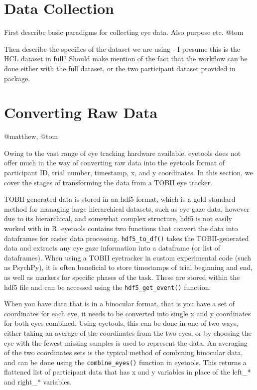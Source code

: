 \documentclass[
  man,
  floatsintext,
  longtable,
  nolmodern,
  notxfonts,
  notimes,
  colorlinks=true,linkcolor=blue,citecolor=blue,urlcolor=blue]{apa7}
\begin{document}
\section{Data Collection}\label{data-collection}

First describe basic paradigms for collecting eye data. Also purpose
etc. @tom

Then describe the specifics of the dataset we are using - I presume this
is the HCL dataset in full? Should make mention of the fact that the
workflow can be done either with the full dataset, or the two
participant dataset provided in package.

\section{Converting Raw Data}\label{converting-raw-data}

@matthew, @tom

Owing to the vast range of eye tracking hardware available, eyetools
does not offer much in the way of converting raw data into the eyetools
format of participant ID, trial number, timestamp, x, and y coordinates.
In this section, we cover the stages of transforming the data from a
TOBII eye tracker.

TOBII-generated data is stored in an hdf5 format, which is a
gold-standard method for managing large hierarchical datasets, such as
eye gaze data, however due to its hierarchical, and somewhat complex
structure, hdf5 is not easily worked with in R. eyetools contains two
functions that convert the data into dataframes for easier data
processing. \texttt{hdf5\_to\_df()} takes the TOBII-generated data and
extracts any eye gaze information into a dataframe (or list of
dataframes). When using a TOBII eyetracker in custom experimental code
(such as PsychPy), it is often beneficial to store timestamps of trial
beginning and end, as well as markers for specific phases of the task.
These are stored within the hdf5 file and can be accessed using the
\texttt{hdf5\_get\_event()} function.

When you have data that is in a binocular format, that is you have a set
of coordinates for each eye, it needs to be converted into single x and
y coordinates for both eyes combined. Using eyetools, this can be done
in one of two ways, either taking an average of the coordinates from the
two eyes, or by choosing the eye with the fewest missing samples is used
to represent the data. An averaging of the two coordinates sets is the
typical method of combining binocular data, and can be done using the
\texttt{combine\_eyes()} function in eyetools. This returns a flattened
list of participant data that has x and y variables in place of the
left\_* and right\_* variables.
\end{document}
